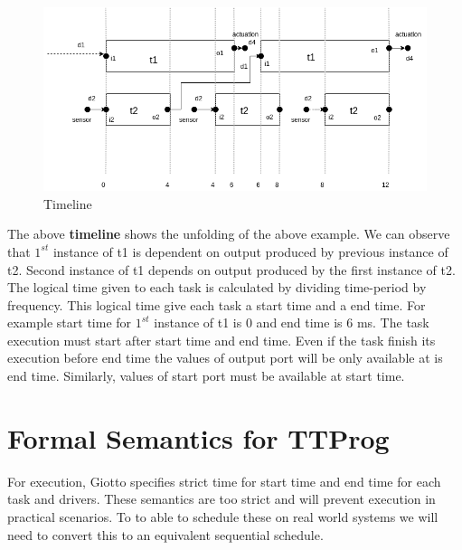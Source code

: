 \documentclass[16pt]{report}
\begin{document}
\begin{figure}[H]
\centering
\includegraphics[width=0.9\linewidth]{10Example.png}
\caption{Timeline}
\end{figure}

The above \textbf{timeline} shows the unfolding of the above example. We can observe that $1^{st}$ instance of t1 is dependent on output produced by previous instance of t2. Second instance of t1 depends on output produced by the first instance of t2. The logical time given to each task is calculated by dividing time-period by frequency. This logical time give each task a start time and a end time. For example start time for $1^{st}$ instance of t1 is 0 and end time is 6 ms. The task execution must start after start time and end time. Even if the task finish its execution before end time the values of output port will be only available at is end time. Similarly, values of start port must be available at start time.

\section{Formal Semantics for TTProg}
For execution, Giotto specifies strict time for start time and end time for each task and drivers. These semantics are too strict and will prevent execution in practical scenarios. To to able to schedule these on real world systems we will need to convert this to an equivalent sequential schedule.
\end{document}
